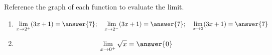 \documentclass{ximera}
\begin{document}
\begin{problem}\label{prob:240hom1prob4}
Reference the graph of each function to evaluate the limit.
\begin{enumerate}
    \item $$\lim_{x\to 2^+}(3x+1)=\answer{7};\quad \lim_{x\to 2^-}(3x+1)=\answer{7};\quad \lim_{x\to 2}(3x+1)=\answer{7}$$
    \item $$\lim_{x\to 0^+}\sqrt{x}=\answer{0}$$
\end{enumerate}
   
 
\end{problem}
\end{document}
